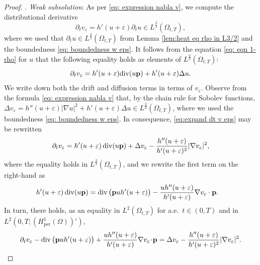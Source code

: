 \documentclass[11pt,a4paper,reqno]{amsart}
\theoremstyle{remark}
\theoremstyle{definition}
\numberwithin{equation}{section}
\newcommand{\per}{\mathrm{per}}
\DeclareMathOperator{\dv}{div}
\newcommand{\p}{{\bf p}}
\begin{document}
\begin{proof}
. \textit{Weak subsolution}: As per \eqref{eq: expression nabla v}, we compute the distributional derivative 
\begin{equation}\label{eq: t deriv expression weps}
    \partial_t v_\varepsilon = h'(u+\varepsilon) \partial_t u \in L^{\frac{3}{2}}(\Omega_{t,T}), 
\end{equation}
where we used that $\partial_t u \in L^{\frac{3}{2}}(\Omega_{t,T})$ from Lemma \ref{lem:heat eq rho in L3/2} and the boundedness \eqref{eq: boundedness w eps}. It follows from the equation \eqref{eq: eqn 1-rho} for $u$ that the following equality holds as elements of $L^{\frac{3}{2}}(\Omega_{t,T})$: 
\begin{equation}\label{eq:expand dt v eps}
    \partial_t v_\varepsilon = {h'(u+\varepsilon)}   {\dv(u\p)} + {h'(u+\varepsilon)}  {\Delta u}. 
\end{equation}
We write down both the drift and diffusion terms in terms of $v_\varepsilon$. Observe from the formula \eqref{eq: expression nabla v} that, by the chain rule for Sobolev functions, $\Delta v_\varepsilon = h''(u+\varepsilon)|\nabla u|^2 + h'(u+\varepsilon) \Delta u \in L^{\frac{3}{2}}(\Omega_{t,T})$, where we used the boundedness \eqref{eq: boundedness w eps}. In consequence, \eqref{eq:expand dt v eps} may be rewritten 
\begin{equation*}
    \begin{aligned}\partial_t v_\varepsilon = {h'(u+\varepsilon)}    \dv(u\p) + \Delta v_\varepsilon - \frac{h''(u+\varepsilon)}{h'(u+\varepsilon)^2}|\nabla v_\varepsilon|^2 , 
    \end{aligned}
\end{equation*}
where the equality holds in  $L^{\frac{3}{2}}(\Omega_{t,T})$, and we rewrite the first term on the right-hand as 
\begin{equation*}
    \begin{aligned}
        {h'(u+\varepsilon)}    \dv(u\p) &= \dv\big( \p u h'(u+\varepsilon) \big) - \frac{u h''(u+\varepsilon)}{h'(u+\varepsilon)}\nabla v_\varepsilon \cdot \p. 
    \end{aligned}
\end{equation*}
In turn, there holds, as an equality in $L^2(\Omega_{t,T})$ for a.e.~$t \in (0,T)$ and in $L^2(0,T;(H^1_\per(\Omega))')$, 
\begin{equation}\label{eq:eqn for v eps}
    \begin{aligned}\partial_t v_\varepsilon - \dv\big( \p u h'(u+\varepsilon) \big) + \frac{u h''(u+\varepsilon)}{h'(u+\varepsilon)}\nabla v_\varepsilon \!\cdot \!\p = \Delta v_\varepsilon - \frac{h''(u+\varepsilon)}{h'(u+\varepsilon)^2}|\nabla v_\varepsilon|^2. 

\end{aligned}
\end{equation}
\end{proof}
\end{document}
